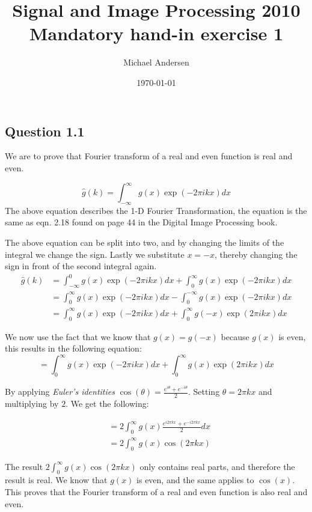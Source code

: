 \documentclass[a4paper, 10pt, final]{article}
\title{Signal and Image Processing 2010 \\ Mandatory hand-in exercise 1}
\author{Michael Andersen}
\date{\today}
\begin{document}
\maketitle

\subsection*{Question 1.1}
We are to prove that Fourier transform of a real and even function is real and even.

\begin{equation*}
    \hat{g}(k) = \int_{-\infty}^{\infty}{g(x)\exp(-2\pi ikx)dx}
\end{equation*}
The above equation describes the 1-D Fourier Transformation, the equation is the same as eqn. 2.18 found on page 44 in the Digital Image Processing book.

The above equation can be split into two, and by changing the limits of the integral we change the sign. Lastly we substitute $x = -x$, thereby changing the sign in front of the second integral again.
\begin{align*}
    \hat{g}(k) & = \int_{-\infty}^{0}{g(x)\exp(-2\pi ikx)dx} + \int_{0}^{\infty}{g(x)\exp(-2\pi ikx)dx}\\
               & = \int_{0}^{\infty}{g(x)\exp(-2\pi ikx)dx} - \int_{0}^{-\infty}{g(x)\exp(-2\pi ikx)dx}\\
               & = \int_{0}^{\infty}{g(x)\exp(-2\pi ikx)dx} + \int_{0}^{\infty}{g(-x)\exp(2\pi ikx)dx}
\end{align*}

We now use the fact that we know that $g(x) = g(-x)$ because $g(x)$ is even, this results in the following equation:
\begin{equation*}
  = \int_{0}^{\infty}{g(x)\exp(-2\pi ikx)dx} + \int_{0}^{\infty}{g(x)\exp(2\pi ikx)dx}
\end{equation*}

By applying \textit{Euler's identities} $\cos(\theta) =
\frac{e^{i\theta} + e^{-i\theta}}{2}$. Setting $\theta = 2\pi kx$ and multiplying by $2$. We get the following:

\begin{align*}
  & = 2 \int_{0}^{\infty} {g(x) \frac{e^{i2\pi kx} + e^{-i2\pi kx}}{2}dx} \\
  & = 2 \int_{0}^{\infty}{g(x) \cos{(2\pi kx)}}
\end{align*}

The result $2 \int_{0}^{\infty}{g(x) \cos{(2\pi kx)}}$ only contains real parts, and therefore the result is real. We know that $g(x)$ is even, and the same applies to $\cos{(x)}$. This proves that the Fourier transform of a real and even function is also real and even.
\end{document}
